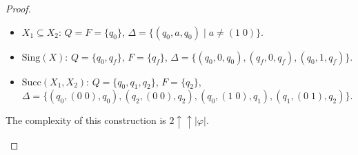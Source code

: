 \documentclass{article}
\begin{document}
\begin{proof}
\begin{description}
	\begin{itemize}
		\item $X_1 \subseteq X_2$: $Q = F = \{q_0\}$, $\Delta = \{(q_0, a, q_0) \mid a \neq (1 \; 0)\}$.
		\item $\text{Sing}(X)$: $Q = \{q_0, q_f\}$, $F = \{q_f\}$, $\Delta = \{(q_0, 0, q_0), (q_f, 0, q_f), (q_0, 1, q_f)\}$.
		\item $\text{Succ}(X_1, X_2)$: $Q = \{q_0, q_1, q_2\}$, $F = \{q_2\}$, \\
		$\Delta = \{ (q_0, (0 \; 0), q_0), (q_2, (0 \; 0), q_2), (q_0, (1 \; 0), q_1), (q_1, (0 \; 1), q_2)\}$.
	\end{itemize}
	
	The complexity of this construction is $2 \uparrow \uparrow |\varphi|$.
	\end{description}
\end{proof}
\end{document}
